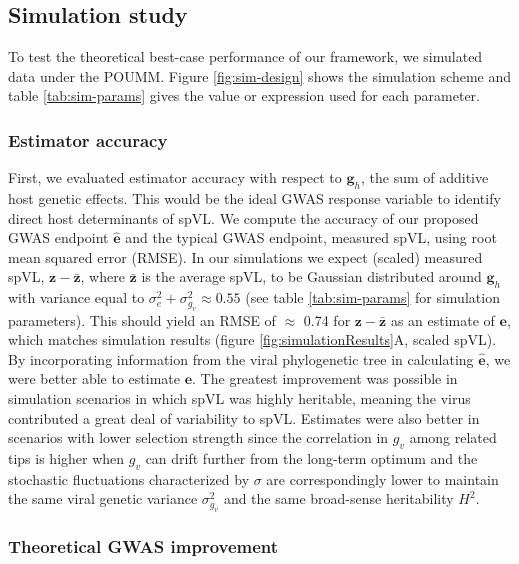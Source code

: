 \documentclass[]{article}
\begin{document}
\begin{doublespace}
\subsection{Simulation study}

To test the theoretical best-case performance of our framework, we simulated data under the POUMM. Figure \ref{fig:sim-design} shows the simulation scheme and table \ref{tab:sim-params} gives the value or expression used for each parameter.

\subsubsection{Estimator accuracy}

First, we evaluated estimator accuracy with respect to $\bm{g}_h$, the sum of additive host genetic effects. This would be the ideal GWAS response variable to identify direct host determinants of spVL. We compute the accuracy of our proposed GWAS endpoint $\bm{\hat{e}}$ and the typical GWAS endpoint, measured spVL, using root mean squared error (RMSE). In our simulations we expect (scaled) measured spVL, $\bm{z} - \bar{\bm{z}}$, where $\bar{\bm{z}}$ is the average spVL, to be Gaussian distributed around $\bm{g}_h$ with variance equal to $\sigma^2_e + \sigma^2_{g_v} \approx 0.55$ (see table \ref{tab:sim-params} for simulation parameters). This should yield an RMSE of $\approx$ 0.74 for $\bm{z} - \bar{\bm{z}}$ as an estimate of $\bm{e}$, which matches simulation results (figure \ref{fig:simulationResults}A, scaled spVL). By incorporating information from the viral phylogenetic tree in calculating $\bm{\hat{e}}$, we were better able to estimate $\bm{e}$. The greatest improvement was possible in simulation scenarios in which spVL was highly heritable, meaning the virus contributed a great deal of variability to spVL. Estimates were also better in scenarios with lower selection strength since the correlation in $g_v$ among related tips is higher when $g_v$ can drift further from the long-term optimum and the stochastic fluctuations characterized by $\sigma$ are correspondingly lower to maintain the same viral genetic variance $\sigma^2_{g_v}$ and the same broad-sense heritability $H^2$.

\subsubsection{Theoretical GWAS improvement}


\end{doublespace}
\end{document}
